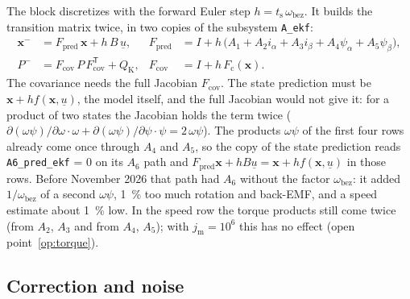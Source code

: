 \documentclass[11pt,a4paper]{scrartcl}
\newcommand{\ped}[1]{_{\mathrm{#1}}}
\newcommand{\code}[1]{\texttt{#1}}
\newcommand{\T}{^{\mathsf{T}}}
\begin{document}
\begin{onehalfspace}
The block discretizes with the forward Euler step $h = t\ped{s}\,\omega\ped{bez}$. It builds the transition matrix twice, in two copies of the subsystem \code{A\_ekf}:
\begin{align}
	\bm{x}^- &= F\ped{pred}\,\bm{x} + h\,B\,\underline{u}, & F\ped{pred} &= I + h\,\big(A_1 + A_2 i_\alpha + A_3 i_\beta + A_4\psi_\alpha + A_5\psi_\beta\big), \label{eq:xpred}\\
	P^- &= F\ped{cov}\,P\,F\ped{cov}\T + Q\ped{K}, & F\ped{cov} &= I + h\,F\ped{c}(\bm{x}) . \label{eq:ppred}
\end{align}
The covariance needs the full Jacobian $F\ped{cov}$. The state prediction must be $\bm{x} + h f(\bm{x}, \underline{u})$, the model itself, and the full Jacobian would not give it: for a product of two states the Jacobian holds the term twice ($\partial(\omega\psi)/\partial\omega\cdot\omega + \partial(\omega\psi)/\partial\psi\cdot\psi = 2\,\omega\psi$). The products $\omega\psi$ of the first four rows already come once through $A_4$ and $A_5$, so the copy of the state prediction reads \code{A6\_pred\_ekf} = 0 on its $A_6$ path and $F\ped{pred}\bm{x} + hB\underline{u} = \bm{x} + h f(\bm{x}, \underline{u})$ in those rows. Before November 2026 that path had $A_6$ without the factor $\omega\ped{bez}$: it added $1/\omega\ped{bez}$ of a second $\omega\psi$, \SI{1}{\percent} too much rotation and back-EMF, and a speed estimate about \SI{1}{\percent} low. In the speed row the torque products still come twice (from $A_2$, $A_3$ and from $A_4$, $A_5$); with $j\ped{m} = 10^6$ this has no effect (open point~\ref{op:torque}).

\subsection{Correction and noise}


\end{onehalfspace}
\end{document}

